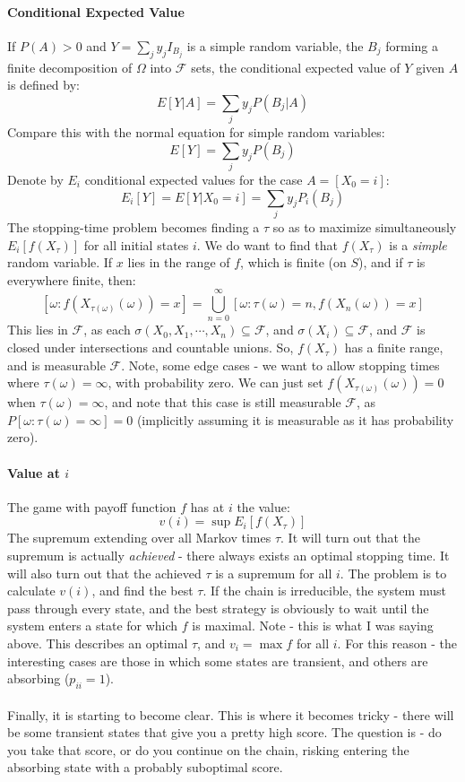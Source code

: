 \documentclass[12pt,a4paper]{article}
\newcommand{\1}[1]{\mathbbm{1}\left\{ #1 \right\}}
\newcommand{\fcal}{\mathcal{F}}
\begin{document}
\paragraph{Conditional Expected Value} If $P(A) > 0$ and $Y = \sum_j y_j I_{B_j}$ is a simple random variable, the $B_j$ forming a finite decomposition of $\Omega$ into $\fcal$ sets, the conditional expected value of $Y$ given $A$ is defined by:
$$
	E[Y|A] = \sum_j y_j P(B_j|A)
$$
Compare this with the normal equation for simple random variables:
$$
	E[Y] = \sum_j y_j P(B_j)
$$
Denote by $E_i$ conditional expected values for the case $A = [X_0 = i]$:
$$
	E_i[Y] = E[Y|X_0 = i] = \sum_j y_j P_i(B_j)
$$
The stopping-time problem becomes finding a $\tau$ so as to maximize simultaneously $E_i[f(X_\tau)]$ for all initial states $i$. We do want to find that $f(X_\tau)$ is a \textit{simple} random variable. If $x$ lies in the range of $f$, which is finite (on $S$), and if $\tau$ is everywhere finite, then:
$$
	\left[\omega : f(X_{\tau(\omega)}(\omega)) = x\right] =
	\bigcup_{n=0}^\infty \left[\omega: \tau(\omega) = n, f(X_n(\omega)) = x\right]
$$
This lies in $\fcal$, as each $\sigma(X_0, X_1, \cdots, X_n) \subseteq \fcal$, and $\sigma(X_i) \subseteq \fcal$, and $\fcal$ is closed under intersections and countable unions. So, $f(X_\tau)$ has a finite range, and is measurable $\fcal$. Note, some edge cases - we want to allow stopping times where $\tau(\omega) = \infty$, with probability zero. We can just set $f(X_{\tau(\omega)}(\omega)) = 0$ when $\tau(\omega) = \infty$, and note that this case is still measurable $\fcal$, as $P[\omega : \tau(\omega) = \infty] = 0$ (implicitly assuming it is measurable as it has probability zero).

\paragraph{Value at $i$} The game with payoff function $f$ has at $i$ the value:
$$
	v(i) = \sup E_i\left[f(X_\tau)\right]
$$
The supremum extending over all Markov times $\tau$. It will turn out that the supremum is actually \textit{achieved} - there always exists an optimal stopping time. It will also turn out that the achieved $\tau$ is a supremum for all $i$. The problem is to calculate $v(i)$, and find the best $\tau$. If the chain is irreducible, the system must pass through every state, and the best strategy is obviously to wait until the system enters a state for which $f$ is maximal. Note - this is what I was saying above. This describes an optimal $\tau$, and $v_i = \max f$ for all $i$. For this reason - the interesting cases are those in which some states are transient, and others are absorbing ($p_{ii} = 1$).
\\\\
Finally, it is starting to become clear. This is where it becomes tricky - there will be some transient states that give you a pretty high score. The question is - do you take that score, or do you continue on the chain, risking entering the absorbing state with a probably suboptimal score.
\end{document}
